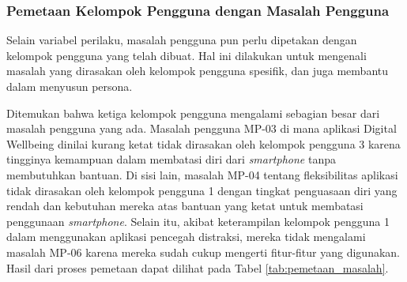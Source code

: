 \subsubsection{Pemetaan Kelompok Pengguna dengan Masalah Pengguna}
Selain variabel perilaku, masalah pengguna pun perlu dipetakan dengan kelompok pengguna yang telah dibuat. Hal ini dilakukan untuk mengenali masalah yang dirasakan oleh kelompok pengguna spesifik, dan juga membantu dalam menyusun persona.

Ditemukan bahwa ketiga kelompok pengguna mengalami sebagian besar dari masalah pengguna yang ada. Masalah pengguna MP-03 di mana aplikasi Digital Wellbeing dinilai kurang ketat tidak dirasakan oleh kelompok pengguna 3 karena tingginya kemampuan dalam membatasi diri dari \textit{smartphone} tanpa membutuhkan bantuan. Di sisi lain, masalah MP-04 tentang fleksibilitas aplikasi tidak dirasakan oleh kelompok pengguna 1 dengan tingkat penguasaan diri yang rendah dan kebutuhan mereka atas bantuan yang ketat untuk membatasi penggunaan \textit{smartphone}. Selain itu, akibat keterampilan kelompok pengguna 1 dalam menggunakan aplikasi pencegah distraksi, mereka tidak mengalami masalah MP-06 karena mereka sudah cukup mengerti fitur-fitur yang digunakan. Hasil dari proses pemetaan dapat dilihat pada Tabel \ref{tab:pemetaan_masalah}.

